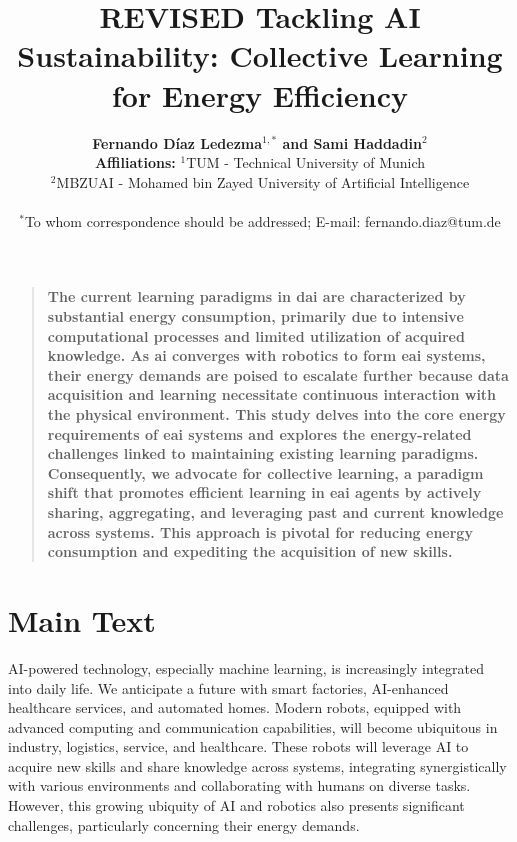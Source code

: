 \documentclass[12pt]{article}
\newenvironment{sciabstract}{%
\begin{quote} \bf}
{\end{quote}}
\begin{document}
 
\baselineskip24pt %

\title{\textbf{REVISED Tackling AI Sustainability: Collective Learning for Energy Efficiency}}

\author
{\textbf{Fernando D\'iaz Ledezma$ {}^{1,\ast}$ and Sami Haddadin${}^{2}$}
    \\
    \normalsize{\textbf{Affiliations:} ${}^{1}$TUM - Technical University of Munich}\\
    \normalsize{${}^{2}$MBZUAI - Mohamed bin Zayed University of Artificial Intelligence}\\
    \\
    \normalsize{$^\ast$To whom correspondence should be addressed; E-mail: fernando.diaz@tum.de}
}

\date{}

\maketitle 

\begin{sciabstract}
The current learning paradigms in \ac{dai} are characterized by substantial energy consumption, primarily due to intensive computational processes and limited utilization of acquired knowledge. As \ac{ai} converges with robotics to form \ac{eai} systems, their energy demands are poised to escalate further because data acquisition and learning necessitate continuous interaction with the physical environment. This study delves into the core energy requirements of \ac{eai} systems and explores the energy-related challenges linked to maintaining existing learning paradigms. Consequently, we advocate for collective learning, a paradigm shift that promotes efficient learning in \ac{eai} agents by actively sharing, aggregating, and leveraging past and current knowledge across systems. This approach is pivotal for reducing energy consumption and expediting the acquisition of new skills.
\end{sciabstract}

\section*{Main Text}

AI-powered technology, especially machine learning, is increasingly integrated into daily life. We anticipate a future with smart factories, AI-enhanced healthcare services, and automated homes. Modern robots, equipped with advanced computing and communication capabilities, will become ubiquitous in industry, logistics, service, and healthcare. These robots will leverage AI to acquire new skills and share knowledge across systems, integrating synergistically with various environments and collaborating with humans on diverse tasks. However, this growing ubiquity of AI and robotics also presents significant challenges, particularly concerning their energy demands.
\end{document}
